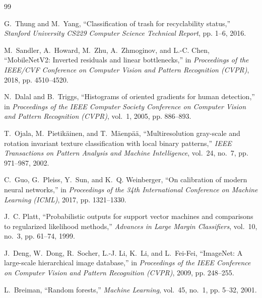 \documentclass[11pt,a4paper]{article}
\begin{document}
\begin{thebibliography}{99}

G.~Thung and M.~Yang, ``Classification of trash for recyclability status,'' \emph{Stanford University CS229 Computer Science Technical Report}, pp. 1--6, 2016.

M.~Sandler, A.~Howard, M.~Zhu, A.~Zhmoginov, and L.-C. Chen, ``{MobileNetV2}: Inverted residuals and linear bottlenecks,'' in \emph{Proceedings of the IEEE/CVF Conference on Computer Vision and Pattern Recognition (CVPR)}, 2018, pp. 4510--4520.

N.~Dalal and B.~Triggs, ``Histograms of oriented gradients for human detection,'' in \emph{Proceedings of the IEEE Computer Society Conference on Computer Vision and Pattern Recognition (CVPR)}, vol.~1, 2005, pp. 886--893.

T.~Ojala, M.~Pietik{\"a}inen, and T.~M{\"a}enp{\"a}{\"a}, ``Multiresolution gray-scale and rotation invariant texture classification with local binary patterns,'' \emph{IEEE Transactions on Pattern Analysis and Machine Intelligence}, vol.~24, no.~7, pp. 971--987, 2002.

C.~Guo, G.~Pleiss, Y.~Sun, and K.~Q. Weinberger, ``On calibration of modern neural networks,'' in \emph{Proceedings of the 34th International Conference on Machine Learning (ICML)}, 2017, pp. 1321--1330.

J.~C. Platt, ``Probabilistic outputs for support vector machines and comparisons to regularized likelihood methods,'' \emph{Advances in Large Margin Classifiers}, vol.~10, no.~3, pp. 61--74, 1999.

J.~Deng, W.~Dong, R.~Socher, L.-J. Li, K.~Li, and L.~Fei-Fei, ``{ImageNet}: A large-scale hierarchical image database,'' in \emph{Proceedings of the IEEE Conference on Computer Vision and Pattern Recognition (CVPR)}, 2009, pp. 248--255.

L.~Breiman, ``Random forests,'' \emph{Machine Learning}, vol.~45, no.~1, pp. 5--32, 2001.

\end{thebibliography}
\end{document}
